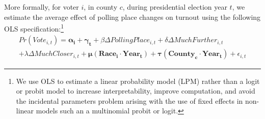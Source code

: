 \documentclass{cup_PSRM}
\begin{document}
More formally, for voter $i$, in county $c$, during presidential election year $t$, we estimate the average effect of polling place changes on turnout using the following OLS specification:\footnote{We use OLS to estimate a linear probability model (LPM) rather than a logit or probit model to increase interpretability, improve computation, and avoid the incidental parameters problem arising with the use of fixed effects in non-linear models such an a multinomial probit or logit.}
\begin{align}
	Pr(Vote_{i,t}) = \boldsymbol{\alpha_{i}} + \boldsymbol{\gamma_{t}}  + \beta \Delta PollingPlace_{i,t}
    +\delta \Delta MuchFurther_{i,t}  \label{equation_traveltime_panel} \\
    + \lambda \Delta MuchCloser_{i,t} + \boldsymbol{\mu}(\boldsymbol{Race_{i}} \cdot \boldsymbol{Year_{t}}) + \boldsymbol{\tau}(\boldsymbol{County_{c}} \cdot \boldsymbol{Year_{t}})  + \epsilon_{i,t} \nonumber
\end{align}
\end{document}
